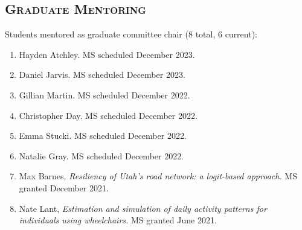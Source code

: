 \documentclass[margin,line]{res}
\newcounter{enuminitialize}
\newenvironment{myenum}[1][]
{%
 \setcounter{enuminitialize}{#1}
 \addtocounter{enuminitialize}{2}
 \begin{enumerate}[left= 4pt, itemsep=12pt, start=\value{enuminitialize}, label=\arabic*\addtocounter{enumi}{-2}]
}
{%
 \end{enumerate}
}
\newcommand{\secfont}{\scshape }
\begin{document}
\begin{resume}
\noindent\makebox[\linewidth]{\rule{\linewidth}{0.4pt}}
\section{\secfont Graduate Mentoring}
Students mentored as graduate committee chair (8 total, 6 current):
\vspace{0.3cm}
\begin{myenum}[8]
  \item Hayden Atchley. MS scheduled December 2023.
  \item Daniel Jarvis. MS scheduled December 2023.
  \item Gillian Martin. MS scheduled December 2022.
  \item Christopher Day. MS scheduled December 2022.
  \item Emma Stucki. MS scheduled December 2022.
  \item Natalie Gray. MS scheduled December 2022.
  \item Max Barnes, \textit{Resiliency of Utah's road network: a logit-based approach.} MS granted December 2021.
  \item Nate Lant, \textit{Estimation and simulation of daily activity patterns for individuals using wheelchairs.} MS granted June 2021.
\end{myenum}


\end{resume}
\end{document}
